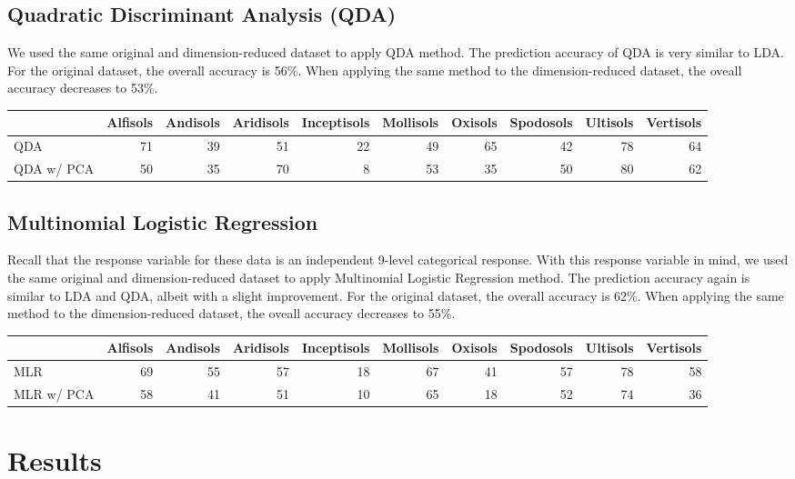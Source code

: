\documentclass[]{article}
\begin{document}
\subsection{Quadratic Discriminant Analysis
(QDA)}\label{quadratic-discriminant-analysis-qda}

We used the same original and dimension-reduced dataset to apply QDA
method. The prediction accuracy of QDA is very similar to LDA. For the
original dataset, the overall accuracy is 56\%. When applying the same
method to the dimension-reduced dataset, the oveall accuracy decreases
to 53\%.

\begin{longtable}[]{@{}lrrrrrrrrr@{}}
\toprule
& Alfisols & Andisols & Aridisols & Inceptisols & Mollisols & Oxisols &
Spodosols & Ultisols & Vertisols\tabularnewline
\midrule
\endhead
QDA & 71 & 39 & 51 & 22 & 49 & 65 & 42 & 78 & 64\tabularnewline
QDA w/ PCA & 50 & 35 & 70 & 8 & 53 & 35 & 50 & 80 & 62\tabularnewline
\bottomrule
\end{longtable}

\subsection{Multinomial Logistic
Regression}\label{multinomial-logistic-regression}

Recall that the response variable for these data is an independent
9-level categorical response. With this response variable in mind, we
used the same original and dimension-reduced dataset to apply
Multinomial Logistic Regression method. The prediction accuracy again is
similar to LDA and QDA, albeit with a slight improvement. For the
original dataset, the overall accuracy is 62\%. When applying the same
method to the dimension-reduced dataset, the oveall accuracy decreases
to 55\%.

\begin{longtable}[]{@{}lrrrrrrrrr@{}}
\toprule
& Alfisols & Andisols & Aridisols & Inceptisols & Mollisols & Oxisols &
Spodosols & Ultisols & Vertisols\tabularnewline
\midrule
\endhead
MLR & 69 & 55 & 57 & 18 & 67 & 41 & 57 & 78 & 58\tabularnewline
MLR w/ PCA & 58 & 41 & 51 & 10 & 65 & 18 & 52 & 74 & 36\tabularnewline
\bottomrule
\end{longtable}

\section{Results}\label{results}
\end{document}
